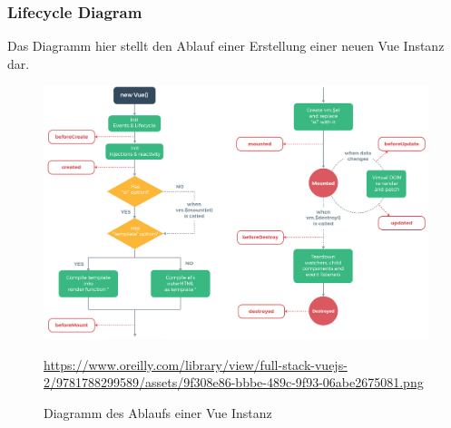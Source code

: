 \subsubsection{Lifecycle Diagram}
Das Diagramm hier stellt den Ablauf einer Erstellung einer neuen Vue Instanz dar.

\begin{figure}[htp]
    \centering
    \includegraphics[scale=0.3]{pics/VueInstanceLifeCycle.png}
    \caption{Diagramm des Ablaufs einer Vue Instanz}
        \small \url{https://www.oreilly.com/library/view/full-stack-vuejs-2/9781788299589/assets/9f308e86-bbbe-489c-9f93-06abe2675081.png}
    \label{fig:impl:VueInstanceLifeCycle}
\end{figure}



